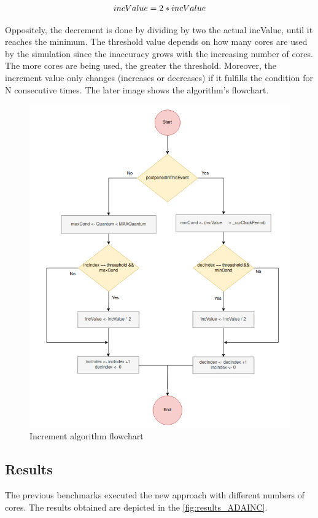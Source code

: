 \begin{equation}
    \label{eq_incValue}
    \centering
        \Large
        incValue = 2 * incValue
        \normalsize
\end{equation}
\vspace{0.3cm}

Oppositely, the decrement is done by dividing by two the actual incValue, until it reaches the minimum. The threshold value depends on how 
many cores are used by the simulation since the inaccuracy grows with the increasing number of cores. The more cores are being used, the greater 
the threshold. Moreover, the increment value only changes (increases or decreases) if it fulfills the condition for N consecutive times. The 
later image shows the algorithm's flowchart. 

\begin{figure}[H]
	\centering
 	\includegraphics[width=0.7\linewidth]{Images/incAlgorithm_flowchart.png}
 	\caption{Increment algorithm flowchart}
	 \label{fig_incAlgorithm_flowchart}
\end{figure}

\subsection{Results}

The previous benchmarks executed the new approach with different numbers of cores. The results obtained are depicted in the 
\autoref{fig:results_ADAINC}. 

